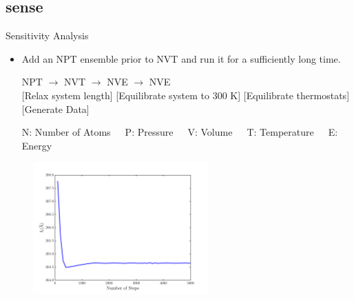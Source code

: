 \documentclass[xcolor={x11names,table},compress,svgnames,mathserif]{beamer}
\renewcommand{\(}{\begin{columns}}
\renewcommand{\)}{\end{columns}}
\newcommand{\<}[1]{\begin{column}{#1}}
\renewcommand{\>}{\end{column}}
\newcommand*\myitem{%
  \item[\color{DeepSkyBlue4}\scalebox{0.6}{\ding{110}}]}
\begin{document}
\subsection{sense}

\begin{frame}{Sensitivity Analysis}
\vspace{2mm}

\begin{itemize}

\myitem Add an NPT ensemble prior to NVT and run it for a sufficiently long time. 
\vspace{2mm}

\begin{center}
{\color{gray}NPT} \hspace{5mm} $\rightarrow$ \hspace{5mm} {\color{green}NVT} \hspace{5mm} $\rightarrow$ \hspace{5mm} 
{\color{cyan}NVE} \hspace{5mm}
$\rightarrow$ \hspace{5mm} {\color{magenta}NVE}
\\ \vspace{1mm}
\tiny [Relax system length] \hspace{1mm}[Equilibrate system to 300 K] \hspace{1mm} [Equilibrate thermostats] \hspace{4mm}
 [Generate Data]
\\ \vspace{1mm}

\tiny{N: Number of Atoms~~~P: Pressure~~~V: Volume~~~T: Temperature~~~E: Energy}
\end{center}

\end{itemize}

\begin{center}
\vspace{-2mm}
\begin{figure}[htbp]
  \includegraphics[width=0.6\textwidth]{./Figures/lx_npt}
  \end{figure}
\end{center}

\end{frame}
\end{document}
